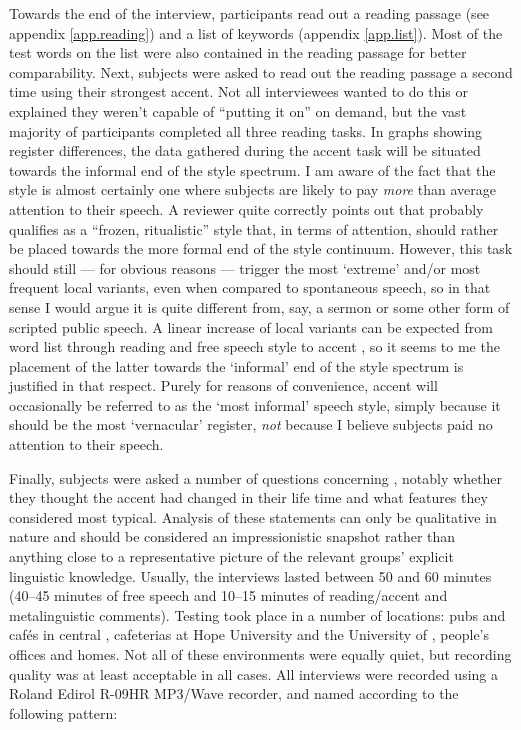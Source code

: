 Towards the end of the interview, participants read out a reading passage (see appendix \ref{app.reading}) and a list of keywords (appendix \ref{app.list}).
Most of the test words on the list were also contained in the reading passage for better comparability.
Next, subjects were asked to read out the reading passage a second time using their strongest  accent. Not all interviewees wanted to do this or explained they weren't capable of ``putting it on'' on demand, but the vast majority of participants completed all three reading tasks.
In graphs showing register differences, the data gathered during the accent  task will be situated towards the informal end of the style spectrum.
I am aware of the fact that the  style is almost certainly one where subjects are likely to pay \emph{more} than average attention to their speech.
A reviewer quite correctly points out that  probably qualifies as a \enquote{frozen, ritualistic} style \parencite{labov1972} that, in terms of attention, should rather be placed towards the more formal end of the style continuum.
However, this task should still --- for obvious reasons --- trigger the most \enquote*{extreme} and/or most frequent local variants, even when compared to spontaneous speech, so in that sense I would argue it is quite different from, say, a sermon or some other form of scripted public speech.
A linear increase of local variants can be expected from word list through reading and free speech style to accent , so it seems to me the placement of the latter towards the \enquote*{informal} end of the style spectrum is justified in that respect.
Purely for reasons of convenience, accent  will occasionally be referred to as the \enquote*{most informal} speech style, simply because it should be the most \enquote*{vernacular} register, \emph{not} because I believe subjects paid no attention to their speech.

Finally, subjects were asked a number of questions concerning , notably whether they thought the accent had changed in their life time and what features they considered most typical.
Analysis of these statements can only be qualitative in nature and should be considered an impressionistic snapshot rather than anything close to a representative picture of the relevant groups' explicit linguistic knowledge. Usually, the interviews lasted between 50 and 60 minutes (40--45 minutes of free speech and 10--15 minutes of reading/accent  and metalinguistic comments).
Testing took place in a number of locations: pubs and cafés in central , cafeterias at Hope University and the University of , people's offices and homes.
Not all of these environments were equally quiet, but recording quality was at least acceptable in all cases. All interviews were recorded using a Roland Edirol R-09HR MP3/Wave recorder, and named according to the following pattern:

